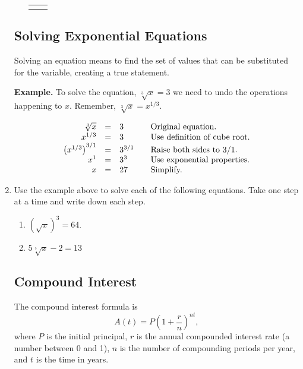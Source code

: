 \begin{enumerate}
\begin{enumerate}
\begin{tabular}{ll}
\begin{minipage}[m]{0.5\linewidth}
\begin{tikzpicture}[y=.6cm, x=.6cm,font=\sffamily,
	mydot/.style={
    circle,
    fill=white,
    draw,
    outer sep=0pt,
    inner sep=1.5pt
  }]
  \end{tikzpicture}
  \end{minipage}
      
  \end{tabular}


\vfill


\end{enumerate}

\clearpage
\subsection{Solving Exponential Equations}
Solving an equation means to find the set of values that can be
substituted for the variable, creating a true statement.


\textbf{Example.} To solve the equation, $\sqrt[3]{x}=3$ we need to
undo the operations happening to $x$.  Remember,
$\sqrt[3]{x}=x^{1/3}$.

\begin{equation*}
  \begin{array}{rcl@{\hspace{2em}}l}
    \sqrt[3]{x} & = & 3 & \textrm{Original~equation.}\\
    x^{1/3} & = & 3 & \textrm{Use~definition~of~cube~root.}\\
    \left(x^{1/3}\right)^{3/1} & = & 3^{3/1} & \textrm{Raise~both~sides~to~$3/1$.}\\
    x^1 & = & 3^3 & \textrm{Use~exponential~properties.} \\
    x & = & 27    & \textrm{Simplify.}
  \end{array}
\end{equation*}

\item Use the example above to solve each of the following
  equations. Take one step at a time and write down each step.
\begin{enumerate}
\item  $\left(\sqrt{x}\right)^{3}=64$. 
  \vfill
\item  $5\sqrt[7]{x}-2=13$
  \vfill
\end{enumerate}




\clearpage
\subsection{Compound Interest}


\noindent The compound interest formula is
$$A(t)=P\left(1+\frac{r}{n}\right) ^{nt},$$
where $P$ is the initial principal, $r$ is the annual compounded
interest rate (a number between 0 and 1), $n$ is the number of
compounding periods per year, and $t$ is the time in years.


\end{enumerate}
